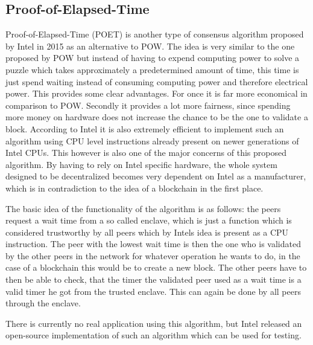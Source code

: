 \subsection{Proof-of-Elapsed-Time}

Proof-of-Elapsed-Time (POET) is another type of consensus algorithm proposed by Intel in 2015 as an alternative to POW. The idea is very similar to the one proposed by POW but instead of having to
expend computing power to solve a puzzle which takes approximately a predetermined amount of time, this time is just spend waiting instead of consuming computing power and therefore electrical power.
This provides some clear advantages. For once it is far more economical in comparison to POW. Secondly it provides a lot more fairness, since spending more money on hardware does not increase the
chance to be the one to validate a block. According to Intel it is also extremely efficient to implement such an algorithm using CPU level instructions already present on newer generations of Intel
CPUs. This however is also one of the major concerns of this proposed algorithm. By having to rely on Intel specific hardware, the whole system designed to be decentralized becomes very dependent on
Intel as a manufacturer, which is in contradiction to the idea of a blockchain in the first place.\cite{url:coinbase_consensus}\par The basic idea of the functionality of the algorithm is as follows:
the peers request a wait time from a so called enclave, which is just a function which is considered trustworthy by all peers which by Intels idea is present as a CPU instruction. The peer with the
lowest wait time is then the one who is validated by the other peers in the network for whatever operation he wants to do, in the case of a blockchain this would be to create a new block. The other
peers have to then be able to check, that the timer the validated peer used as a wait time is a valid timer he got from the trusted enclave. This can again be done by all peers through the
enclave.\par There is currently no real application using this algorithm, but Intel released an open-source implementation of such an algorithm which can be used for testing.\cite{url:poet}
